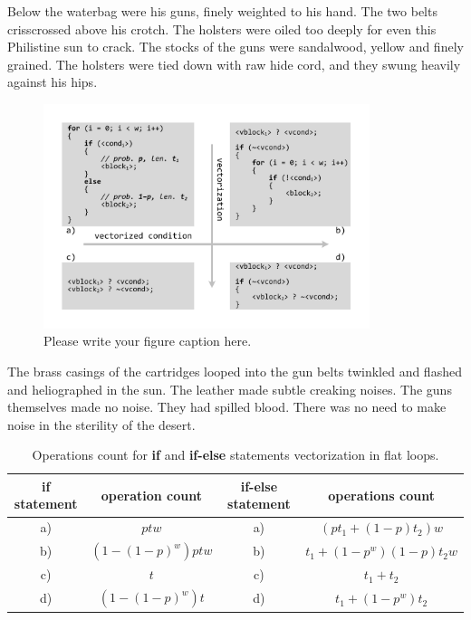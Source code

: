 \documentclass[
11pt,%
tightenlines,%
twoside,%
onecolumn,%
nofloats,%
nobibnotes,%
nofootinbib,%
superscriptaddress,%
noshowpacs,%
centertags]%
{revtex4}
\begin{document}
Below the waterbag were his guns, finely weighted to his hand. The two belts crisscrossed above his crotch. The holsters were oiled too deeply for even this Philistine sun to crack. The stocks of the guns were sandalwood, yellow and finely grained. The holsters were tied down with raw hide cord, and they swung heavily against his hips.

\begin{figure}[h]
\setcaptionmargin{5mm}
\onelinecaptionstrue  %
\includegraphics[width=0.85\textwidth]{pics/if_else_vectorization.pdf}
\caption{Please write your figure caption here.}\label{fig:1}
\end{figure}

The brass casings of the cartridges looped into the gun belts twinkled and flashed and heliographed in the sun. The leather made subtle creaking noises. The guns themselves made no noise. They had spilled blood. There was no need to make noise in the sterility of the desert.

\begin{table}[!h]
\setcaptionmargin{0mm}
\onelinecaptionsfalse
{}
\caption{Operations count for \textbf{if} and \textbf{if-else} statements vectorization in flat loops.}
\bigskip
\begin{tabular}{|c|c|c|c|}
\hline
\textbf{if} statement & operation count & \textbf{if-else} statement & operations count \\
\hline
a) & $ptw$ & a) & $\left( pt_1 + (1 - p)t_2 \right)w$ \\
b) & $\left( 1 - (1 - p)^w \right)ptw$ & b) & $t_1 + (1 - p^w)(1 - p)t_2w$ \\
c) & $t$ & c) & $t_1 + t_2$ \\
d) & $\left( 1 - (1 - p)^w \right)t$ & d) & $t_1 + (1 - p^w)t_2$ \\
\hline
\end{tabular}
\end{table}
\end{document}
